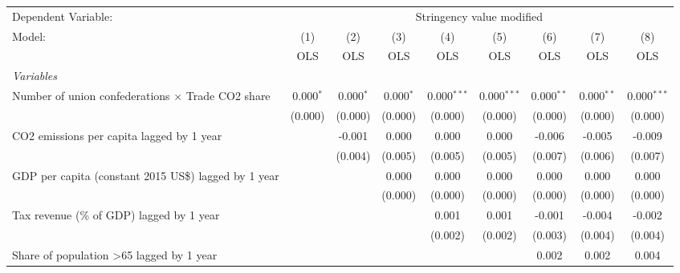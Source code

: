 
\begingroup
\centering
\begin{tabular}{lcccccccc}
   \toprule
   Dependent Variable: & \multicolumn{8}{c}{Stringency value modified}\\
   Model:                                                    & (1)         & (2)         & (3)         & (4)           & (5)           & (6)          & (7)          & (8)\\  
                                                             &  OLS        & OLS         & OLS         & OLS           & OLS           & OLS          & OLS          & OLS\\  
   \midrule
   \emph{Variables}\\
   Number of union confederations $\times$ Trade CO2 share   & 0.000$^{*}$ & 0.000$^{*}$ & 0.000$^{*}$ & 0.000$^{***}$ & 0.000$^{***}$ & 0.000$^{**}$ & 0.000$^{**}$ & 0.000$^{***}$\\   
                                                             & (0.000)     & (0.000)     & (0.000)     & (0.000)       & (0.000)       & (0.000)      & (0.000)      & (0.000)\\   
   CO2 emissions per capita lagged by 1 year                 &             & -0.001      & 0.000       & 0.000         & 0.000         & -0.006       & -0.005       & -0.009\\   
                                                             &             & (0.004)     & (0.005)     & (0.005)       & (0.005)       & (0.007)      & (0.006)      & (0.007)\\   
   GDP per capita (constant 2015 US\$) lagged by 1 year      &             &             & 0.000       & 0.000         & 0.000         & 0.000        & 0.000        & 0.000\\   
                                                             &             &             & (0.000)     & (0.000)       & (0.000)       & (0.000)      & (0.000)      & (0.000)\\   
   Tax revenue (\% of GDP) lagged by 1 year                  &             &             &             & 0.001         & 0.001         & -0.001       & -0.004       & -0.002\\   
                                                             &             &             &             & (0.002)       & (0.002)       & (0.003)      & (0.004)      & (0.004)\\   
   Share of population >65 lagged by 1 year                  &             &             &             &               &               & 0.002        & 0.002        & 0.004\\   

\end{tabular}
